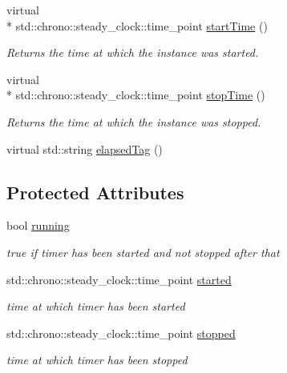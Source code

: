 \begin{DoxyCompactItemize}
virtual \\*
std\-::chrono\-::steady\-\_\-clock\-::time\-\_\-point \hyperlink{class_aux_1_1_timer_a767c6de21191f9bee75c35edd9df2c9e}{start\-Time} ()
\begin{DoxyCompactList}\small\item\em Returns the time at which the instance was started. \end{DoxyCompactList}\item 
virtual \\*
std\-::chrono\-::steady\-\_\-clock\-::time\-\_\-point \hyperlink{class_aux_1_1_timer_a2ecdbad6184276140eb88480d04b417e}{stop\-Time} ()
\begin{DoxyCompactList}\small\item\em Returns the time at which the instance was stopped. \end{DoxyCompactList}\item 
virtual std\-::string \hyperlink{class_aux_1_1_timer_a428b45cb66f4be47bbea61b0db368142}{elapsed\-Tag} ()
\end{DoxyCompactItemize}
\subsection*{Protected Attributes}
\begin{DoxyCompactItemize}
\item 
bool \hyperlink{class_aux_1_1_timer_a5a85ed37ed9e2f0eb07e35a465094b9f}{running}
\begin{DoxyCompactList}\small\item\em true if timer has been started and not stopped after that \end{DoxyCompactList}\item 
std\-::chrono\-::steady\-\_\-clock\-::time\-\_\-point \hyperlink{class_aux_1_1_timer_a2fde73af550d464ac12d62eb53c3a976}{started}
\begin{DoxyCompactList}\small\item\em time at which timer has been started \end{DoxyCompactList}\item 
std\-::chrono\-::steady\-\_\-clock\-::time\-\_\-point \hyperlink{class_aux_1_1_timer_a2b2db52da1cb51c6940597173133d910}{stopped}
\begin{DoxyCompactList}\small\item\em time at which timer has been stopped \end{DoxyCompactList}\end{DoxyCompactItemize}


